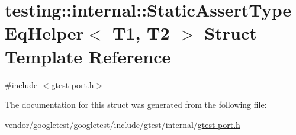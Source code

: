 \hypertarget{structtesting_1_1internal_1_1StaticAssertTypeEqHelper}{}\section{testing\+:\+:internal\+:\+:Static\+Assert\+Type\+Eq\+Helper$<$ T1, T2 $>$ Struct Template Reference}
\label{structtesting_1_1internal_1_1StaticAssertTypeEqHelper}


{\ttfamily \#include $<$gtest-\/port.\+h$>$}



The documentation for this struct was generated from the following file\+:\begin{DoxyCompactItemize}
\item 
vendor/googletest/googletest/include/gtest/internal/\hyperlink{gtest-port_8h}{gtest-\/port.\+h}\end{DoxyCompactItemize}
